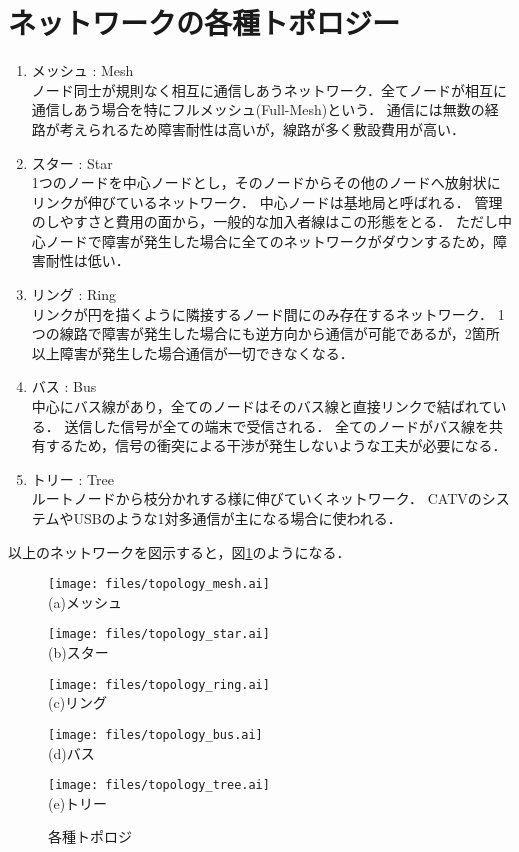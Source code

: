\documentclass[10.5pt]{jsarticle}
\begin{document}
\section{ネットワークの各種トポロジー}
\begin{enumerate}
\item{メッシュ : Mesh}\\
ノード同士が規則なく相互に通信しあうネットワーク．全てノードが相互に通信しあう場合を特にフルメッシュ(Full-Mesh)という．
通信には無数の経路が考えられるため障害耐性は高いが，線路が多く敷設費用が高い．
\item{スター : Star}\\
1つのノードを中心ノードとし，そのノードからその他のノードへ放射状にリンクが伸びているネットワーク．
中心ノードは基地局と呼ばれる．
管理のしやすさと費用の面から，一般的な加入者線はこの形態をとる．
ただし中心ノードで障害が発生した場合に全てのネットワークがダウンするため，障害耐性は低い．
\item{リング : Ring}\\
リンクが円を描くように隣接するノード間にのみ存在するネットワーク．
1つの線路で障害が発生した場合にも逆方向から通信が可能であるが，2箇所以上障害が発生した場合通信が一切できなくなる．
\item{バス : Bus}\\
中心にバス線があり，全てのノードはそのバス線と直接リンクで結ばれている．
送信した信号が全ての端末で受信される．
全てのノードがバス線を共有するため，信号の衝突による干渉が発生しないような工夫が必要になる．
\item{トリー : Tree}\\
ルートノードから枝分かれする様に伸びていくネットワーク．
CATVのシステムやUSBのような1対多通信が主になる場合に使われる．
\end{enumerate}
以上のネットワークを図示すると，図\ref{topology}のようになる．
\begin{figure}[h]
	\centering
	\begin{minipage}{0.25\hsize}
		\centering
		\texttt{[image: files/topology\_mesh.ai]}\\
		(a)メッシュ
	\end{minipage}
	\begin{minipage}{0.25\hsize}
		\centering
		\texttt{[image: files/topology\_star.ai]}\\
		(b)スター
	\end{minipage}
	\begin{minipage}{0.25\hsize}
		\centering
		\texttt{[image: files/topology\_ring.ai]}\\
		(c)リング
	\end{minipage}
	\begin{minipage}{0.35\hsize}
		\centering
		\texttt{[image: files/topology\_bus.ai]}\\
		(d)バス
	\end{minipage}
	\begin{minipage}{0.35\hsize}
		\centering
		\texttt{[image: files/topology\_tree.ai]}\\
		(e)トリー
	\end{minipage}
	\caption{各種トポロジ}\label{topology}
\end{figure}
\end{document}
